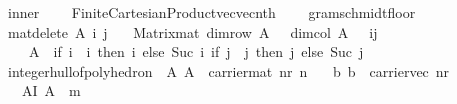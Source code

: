\begin{isabellebody}
\ inner\ {\isacharparenleft}{\kern0pt}\ {\isachardoublequoteopen}{\isasymbullet}{\isachardoublequoteclose}\ {}{}{\isacharparenright}{\kern0pt}\isanewline
{}\isamarkupfalse%
\ Finite{\isacharunderscore}{\kern0pt}Cartesian{\isacharunderscore}{\kern0pt}Product{\isachardot}{\kern0pt}vec{\isachardot}{\kern0pt}vec{\isacharunderscore}{\kern0pt}nth\ {\isacharparenleft}{\kern0pt}\ {\isachardoublequoteopen}{\isachardollar}{\kern0pt}{\isachardoublequoteclose}\ {}{}{\isacharparenright}{\kern0pt}\isanewline
\isanewline
{}\isamarkupfalse%
\ gram{\isacharunderscore}{\kern0pt}schmidt{\isacharunderscore}{\kern0pt}floor\isanewline
{}\ \isanewline
\isanewline
{}\isamarkupfalse%
\ {\isachardoublequoteopen}mat{\isacharunderscore}{\kern0pt}delete{}\ A\ i\ j\ {\isasymequiv}\isanewline
\ \ Matrix{\isachardot}{\kern0pt}mat\ {\isacharparenleft}{\kern0pt}dim{\isacharunderscore}{\kern0pt}row\ A\ {\isacharminus}{\kern0pt}\ {}{\isacharparenright}{\kern0pt}\ {\isacharparenleft}{\kern0pt}dim{\isacharunderscore}{\kern0pt}col\ A\ {\isacharminus}{\kern0pt}\ {}{\isacharparenright}{\kern0pt}\ {\isacharparenleft}{\kern0pt}{\isasymlambda}{\isacharparenleft}{\kern0pt}i{\isacharprime}{\kern0pt}{\isacharcomma}{\kern0pt}j{\isacharprime}{\kern0pt}{\isacharparenright}{\kern0pt}{\isachardot}{\kern0pt}\isanewline
\ \ \ \ A\ {\isachardollar}{\kern0pt}{\isachardollar}{\kern0pt}\ {\isacharparenleft}{\kern0pt}if\ i{\isacharprime}{\kern0pt}\ {\isacharless}{\kern0pt}\ i\ then\ i{\isacharprime}{\kern0pt}\ else\ Suc\ i{\isacharprime}{\kern0pt}{\isacharcomma}{\kern0pt}\ if\ j{\isacharprime}{\kern0pt}\ {\isacharless}{\kern0pt}\ j\ then\ j{\isacharprime}{\kern0pt}\ else\ Suc\ j{\isacharprime}{\kern0pt}{\isacharparenright}{\kern0pt}{\isacharparenright}{\kern0pt}{\isachardoublequoteclose}\isanewline
\isanewline
\isanewline
\isanewline
{}\isamarkupfalse%
\ integer{\isacharunderscore}{\kern0pt}hull{\isacharunderscore}{\kern0pt}of{\isacharunderscore}{\kern0pt}polyhedron{}{\isacharcolon}{\kern0pt}\ \ A{\isacharcolon}{\kern0pt}\ {\isachardoublequoteopen}A\ {\isasymin}\ carrier{\isacharunderscore}{\kern0pt}mat\ nr\ n{\isachardoublequoteclose}\isanewline
\ \ \ b{\isacharcolon}{\kern0pt}\ {\isachardoublequoteopen}b\ {\isasymin}\ carrier{\isacharunderscore}{\kern0pt}vec\ nr{\isachardoublequoteclose}\isanewline
\ \ \ AI{\isacharcolon}{\kern0pt}\ {\isachardoublequoteopen}A\ {\isasymin}\ {\isasymint}\isactrlsub m{\isachardoublequoteclose}\isanewline

\end{isabellebody}

